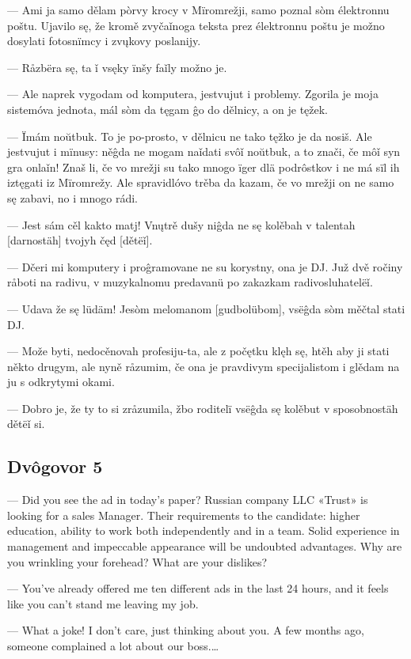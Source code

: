 — Ami ja samo dělam pòrvy krocy v Mïromrežji, samo poznal sòm élektronnu poštu. Ujavilo sę, že kromě zvyčaǐnoga teksta prez élektronnu poštu je možno dosylati fotosnïmcy i zvųkovy poslanijy.

— Råzbëra sę, ta ǐ vsęky ïnšy faǐly možno je.

— Ale naprek vygodam od komputera, jestvujut i problemy. Zgorila je moja sistemóva jednota, mál sòm da tęgam ĝo do dělnicy, a on je tęžek.

— Ïmám noŭtbuk. To je po-prosto, v dělnicu ne tako tęžko je da nosiš. Ale jestvujut i mïnusy: něĝda ne mogam naǐdati svôǐ noŭtbuk, a to znači, če môǐ syn gra onlaǐn! Znaš li, če vo mrežji su tako mnogo ïger dlä podrôstkov i ne má sïl ih iztęgati iz Mïromrežy. Ale spravidlóvo trěba da kazam, če vo mrežji on ne samo sę zabavi, no i mnogo rádi.

— Jest sám cěl kakto matj! Vnųtrě dušy niĝda ne sę kolěbah v talentah [darnostäh] tvojyh čęd [dětëǐ].

— Dčeri mi komputery i proĝramovane ne su korystny, ona je DJ. Juž dvě ročiny råboti na radivu, v muzykalnomu predavanü po zakazkam radivosluhatelëǐ.

— Udava že sę lüdäm! Jesòm melomanom [gudbolübom], vsëĝda sòm měčtal stati DJ.

— Može byti, nedocěnovah profesiju-ta, ale z počętku klęh sę, htěh aby ji stati někto drugym, ale nyně råzumim, če ona je pravdivym specijalistom i glědam na ju s odkrytymi okami.

— Dobro je, že ty to si zråzumila, žbo roditelï vsëĝda sę kolěbut v sposobnostäh dětëǐ si.


\subsection{Dvôgovor 5}


— Did you see the ad in today’s paper? Russian company LLC «Trust» is looking for a sales Manager. Their requirements to the candidate: higher education, ability to work both independently and in a team. Solid experience in management and impeccable appearance will be undoubted advantages. Why are you wrinkling your forehead? What are your dislikes?

— You’ve already offered me ten different ads in the last 24 hours, and it feels like you can’t stand me leaving my job.

— What a joke! I don’t care, just thinking about you. A few months ago, someone complained a lot about our boss.…

